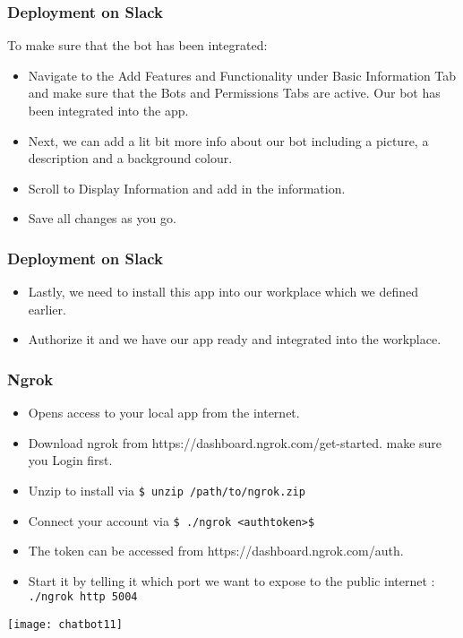  \begin{frame}[fragile]\frametitle{Deployment on Slack}
To make sure that the bot has been integrated:

\begin{itemize}
\item Navigate to the Add Features and Functionality under Basic Information Tab and make sure that the Bots and Permissions Tabs are active. Our bot has been integrated into the app.
\item Next, we can add a lit bit more info about our bot including a picture, a description and a background colour. 
\item Scroll to Display Information and add in the information.
\item Save all changes as you go.
\end{itemize}

\end{frame}

 \begin{frame}[fragile]\frametitle{Deployment on Slack}

\begin{itemize}
\item Lastly, we need to install this app into our workplace which we defined earlier. 
\item Authorize it and we have our app ready and integrated into the workplace.
\end{itemize}

\end{frame}

 \begin{frame}[fragile]\frametitle{Ngrok}

\begin{itemize}
\item Opens access to your local app from the internet.
\item Download ngrok from https://dashboard.ngrok.com/get-started. make sure you Login first.
\item Unzip to install via \lstinline|$ unzip /path/to/ngrok.zip|
\item Connect your account via \lstinline|$ ./ngrok <authtoken>$|
\item The token can be accessed from https://dashboard.ngrok.com/auth.
\item Start it by telling it which port we want to expose to the public internet : \lstinline|./ngrok http 5004|
\end{itemize}

\begin{center}
\texttt{[image: chatbot11]}
\end{center}
\end{frame}

